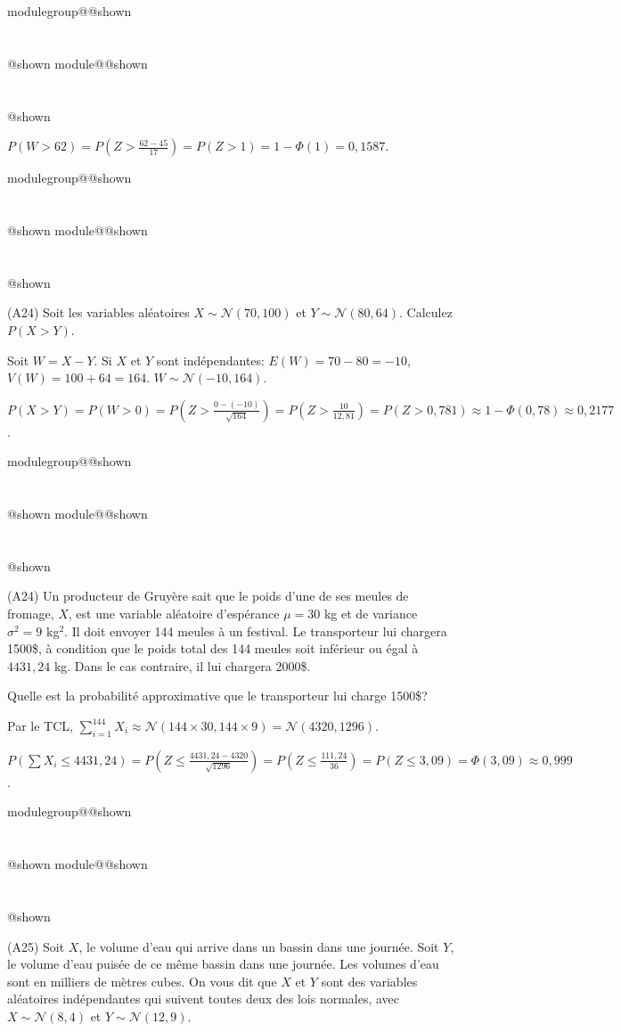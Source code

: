 \documentclass{Evaluation}
\makeatletter
\newcommand{\currentmodulekey}{}
\newcommand{\currentmoduletitle}{}
\newcommand{\currentgroupkey}{}
\newcommand{\currentgrouptitle}{}
\newcommand{\showmoduleifneeded}{%
  \ifx\currentgroupkey\empty\else
    \expandafter\ifx\csname modulegroup@\currentgroupkey @shown\endcsname\relax
      \section*{\currentgrouptitle}%
      \expandafter\gdef\csname modulegroup@\currentgroupkey @shown\endcsname{1}%
    \fi
  \fi
  \expandafter\ifx\csname module@\currentmodulekey @shown\endcsname\relax
    \section*{\currentmoduletitle}%
    \expandafter\gdef\csname module@\currentmodulekey @shown\endcsname{1}%
  \fi
}
\newenvironment{H24}{\showmoduleifneeded}{}
\newenvironment{A24}{\showmoduleifneeded}{}
\newenvironment{A25}{\showmoduleifneeded}{}
\makeatother
\begin{document}
\begin{questions}
\begin{H24}
\begin{parts}
\begin{solution}
    $P(W>62)=P\left(Z>\frac{62-45}{17}\right)=P(Z>1)=1-\Phi(1)=0,1587$.
\end{solution}

\end{parts}
\end{H24}

\begin{A24}
\question (A24) Soit les variables aléatoires $X\sim\mathcal{N}(70, 100)$ et $Y\sim\mathcal{N}(80, 64)$.
Calculez $P(X>Y)$.

\begin{solution}
    Soit $W=X-Y$. Si $X$ et $Y$ sont indépendantes: $E(W)=70-80=-10$, $V(W)=100+64=164$. $W\sim\mathcal{N}(-10,164)$.

    $P(X>Y)=P(W>0)=P\left(Z>\frac{0-(-10)}{\sqrt{164}}\right)=P\left(Z>\frac{10}{12,81}\right)=P(Z>0,781)\approx 1-\Phi(0,78)\approx 0,2177$.
\end{solution}
\end{A24}

\begin{A24}
\question (A24) Un producteur de Gruyère sait que le poids d'une de ses meules de fromage, $X$, est une variable aléatoire d'espérance $\mu=30$ kg et de variance $\sigma^2 = 9$ kg$^2$. 
Il doit envoyer 144 meules à un festival. 
Le transporteur lui chargera 1500\$, à condition que le poids total des 144 meules soit inférieur ou égal à $4431,24$ kg. 
Dans le cas contraire, il lui chargera 2000\$.

Quelle est la probabilité approximative que le transporteur lui charge 1500\$?

\begin{solution}
    Par le TCL, $\sum_{i=1}^{144}X_i \approx \mathcal{N}(144\times 30, 144\times 9)=\mathcal{N}(4320, 1296)$.

    $P\left(\sum X_i\leq 4431,24\right)=P\left(Z\leq\frac{4431,24-4320}{\sqrt{1296}}\right)=P\left(Z\leq\frac{111,24}{36}\right)=P(Z\leq 3,09)=\Phi(3,09)\approx 0,999$.
\end{solution}
\end{A24}
    

\begin{A25}
\question (A25) Soit $X$, le volume d'eau qui arrive dans un bassin dans une journée. Soit $Y$, le volume d'eau puisée de ce même bassin dans une journée. 
Les volumes d'eau sont en milliers de mètres cubes. 
On vous dit que $X$ et $Y$ sont des variables aléatoires indépendantes qui suivent toutes deux des lois normales, avec 
$X\sim \mathcal{N}(8,4)$ et $Y\sim \mathcal{N}(12,9)$.


\end{A25}
\end{questions}
\end{document}
